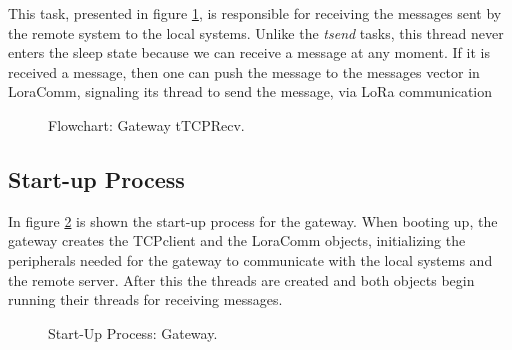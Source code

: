 %
%
%

This task, presented in figure \ref{fig:gwtTCPRecv}, is responsible for receiving the messages sent by the remote system to the local systems. Unlike the \textit{tsend} tasks, this thread never enters the sleep state because we can receive a message at any moment. If it is received a message, then one can push the message to the messages vector in LoraComm, signaling its thread to send the message, via LoRa communication

\begin{figure}[H]
	\centering
	\caption{Flowchart: Gateway tTCPRecv.}
	\label{fig:gwtTCPRecv}
\end{figure}

\clearpage
\subsection{Start-up Process}
In figure \ref{fig:bootGateway} is shown the start-up process for the gateway. When booting up, the gateway creates the TCPclient and the LoraComm objects, initializing the peripherals needed for the gateway to communicate with the local systems and the remote server. After this the threads are created and both objects begin running their threads for receiving messages.

\begin{figure}[H]
	\centering
	\caption{Start-Up Process: Gateway.}
	\label{fig:bootGateway}
\end{figure}


